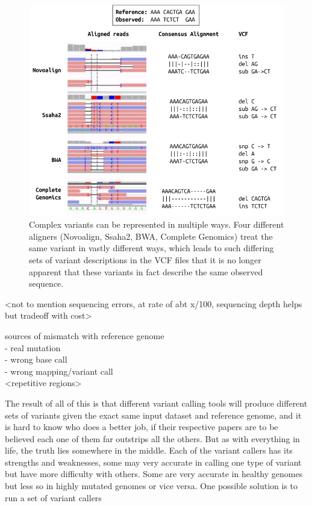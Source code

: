 \begin{figure}[h!]
    \centering
    \includegraphics[width=400pt]{chapters/images/variant-representation-all.png}

    \caption{Complex variants can be represented in multiple ways. Four different aligners (Novoalign, Ssaha2, BWA, Complete Genomics) treat the same variant in vastly different ways, which leads to such differing sets of variant descriptions in the VCF files that it is no longer apparent that these variants in fact describe the same observed sequence.}
    \label{fig:variant-multiple-representations}
\end{figure}


<not to mention sequencing errors, at rate of abt x/100, sequencing depth helps but tradeoff with cost>

sources of mismatch with reference genome \\
- real mutation \\
- wrong base call \\
- wrong mapping/variant call \\


<repetitive regions>

The result of all of this is that different variant calling tools will produce different sets of variants given the exact same input dataset and reference genome, and it is hard to know who does a better job, if their respective papers are to be believed each one of them far outstrips all the others. But as with everything in life, the truth lies somewhere in the middle. Each of the variant callers has its strengths and weaknesses, some may very accurate in calling one type of variant but have  more difficulty with others. Some are very accurate in healthy genomes but less so in highly mutated genomes or vice versa. One possible solution is to run a set of variant callers

